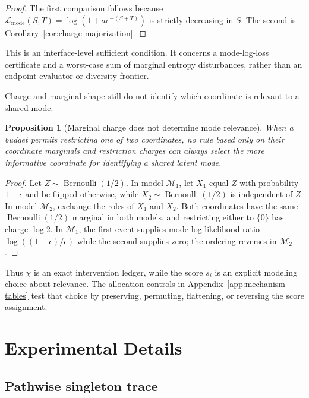 \documentclass{article}
\newcommand{\1}{\mathbf 1}
\newtheorem{proposition}[theorem]{Proposition}
\theoremstyle{definition}
\begin{document}
\begin{proof}
The first comparison follows because
$\mathcal L_{\mathrm{mode}}(S,T)=\log(1+ae^{-(S+T)})$ is strictly decreasing
in $S$. The second is Corollary~\ref{cor:charge-majorization}.
\end{proof}

This is an interface-level sufficient condition. It concerns a mode-log-loss
certificate and a worst-case sum of marginal entropy disturbances, rather than
an endpoint evaluator or diversity frontier.

Charge and marginal shape still do not identify which coordinate is relevant
to a shared mode.

\begin{proposition}[Marginal charge does not determine mode relevance]
\label{prop:charge-no-free-lunch}
When a budget permits restricting one of two coordinates, no rule based only on
their coordinate marginals and restriction charges can always select the more
informative coordinate for identifying a shared latent mode.
\end{proposition}

\begin{proof}
Let $Z\sim\operatorname{Bernoulli}(1/2)$. In model $\mathcal M_1$, let $X_1$
equal $Z$ with probability $1-\epsilon$ and be flipped otherwise, while
$X_2\sim\operatorname{Bernoulli}(1/2)$ is independent of $Z$. In model
$\mathcal M_2$, exchange the roles of $X_1$ and $X_2$. Both coordinates have
the same $\operatorname{Bernoulli}(1/2)$ marginal in both models, and
restricting either to $\{0\}$ has charge $\log2$. In $\mathcal M_1$, the first
event supplies mode log likelihood ratio
$\log((1-\epsilon)/\epsilon)$ while the second supplies zero; the ordering
reverses in $\mathcal M_2$.
\end{proof}

Thus $\chi$ is an exact intervention ledger, while the score $s_i$ is an
explicit modeling choice about relevance. The allocation controls in
Appendix~\ref{app:mechanism-tables} test that choice by preserving, permuting,
flattening, or reversing the score assignment.
\fi

\FloatBarrier

\section{Experimental Details}
\label{app:experiment-details}

\subsection{Pathwise singleton trace}
\label{app:singleton-trace}
\end{document}
